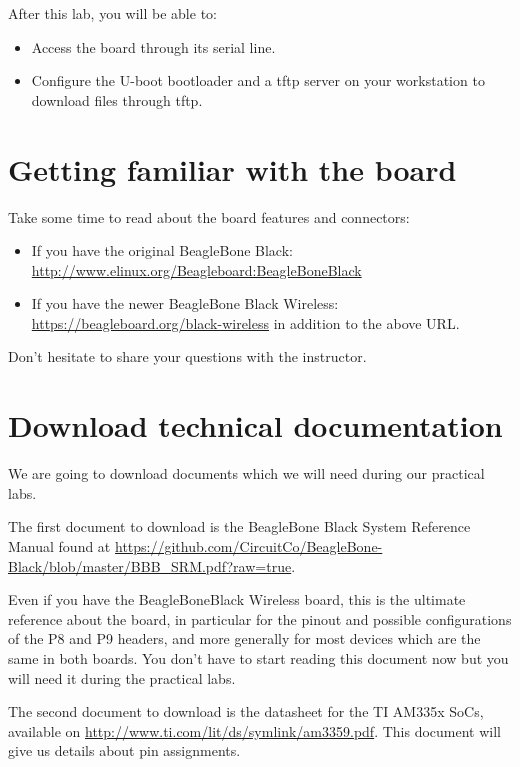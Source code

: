 
After this lab, you will be able to:
\begin{itemize}
\item Access the board through its serial line.
\item Configure the U-boot bootloader and a tftp server
      on your workstation to download files through tftp.
\end{itemize}

\section{Getting familiar with the board}

Take some time to read about the board features and connectors:

\begin{itemize}
   \item If you have the original BeagleBone Black: \url{http://www.elinux.org/Beagleboard:BeagleBoneBlack}
   \item If you have the newer BeagleBone Black Wireless:
\url{https://beagleboard.org/black-wireless} in addition to the above URL. 
\end{itemize}

Don't hesitate to share your questions with the instructor.

\section{Download technical documentation}

We are going to download documents which we will need during our
practical labs.

The first document to download is the BeagleBone Black System Reference Manual found at
\url{https://github.com/CircuitCo/BeagleBone-Black/blob/master/BBB_SRM.pdf?raw=true}.

Even if you have the BeagleBoneBlack Wireless board, this is the
ultimate reference about the board, in particular for the pinout and
possible configurations of the P8 and P9 headers, and more generally
for most devices which are the same in both boards.
You don't have to start reading this document now but you will need it
during the practical labs.

The second document to download is the datasheet for the
TI AM335x SoCs, available on
\url{http://www.ti.com/lit/ds/symlink/am3359.pdf}. This document will
give us details about pin assignments.

